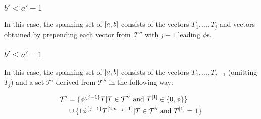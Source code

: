\subsubsection{\texorpdfstring
{$b' < a' - 1$}
{b' < a' - 1}
}

In this case,
the spanning set of $[a, b]$ consists
of the vectors $T_1, \ldots, T_j$ and vectors obtained
by prepending each vector from $\mathcal{T}''$ with
$j-1$ leading $\phi$s.

\subsubsection{\texorpdfstring
{$b' \leq a' - 1$}
{b' >= a' - 1}
}

In this case,
the spanning set of $[a, b]$ consists
of the vectors $T_1, \ldots, T_{j-1}$ (omitting $T_j$)
and a set $\mathcal{T}'$ derived from $\mathcal{T}''$
in the following way:

\begin{align*}
\mathcal{T}' &= \{
\phi^{\{j-1\}} T | T \in \mathcal{T}'' \text{ and }
T^{[1]} \in \{0, \phi\}
\} \\
&\cup \{
1 \phi^{\{j-1\}} T^{[2, n-j+1]} | T \in \mathcal{T}''
\text{ and } T^{[1]} = 1
\}
\end{align*}

